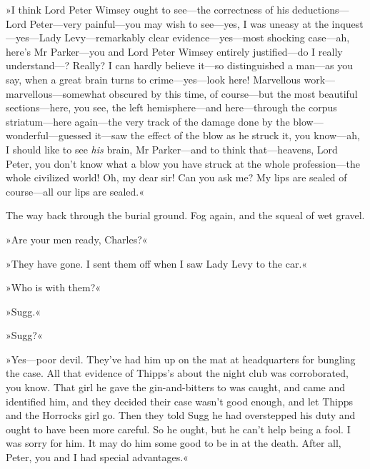 »I think Lord Peter Wimsey ought to see\allowbreak---\allowbreak the correctness of his deductions\allowbreak---\allowbreak Lord Peter\allowbreak---\allowbreak very painful\allowbreak---\allowbreak you may wish to see\allowbreak---\allowbreak yes, I was uneasy at the inquest\allowbreak---\allowbreak yes---Lady Levy\allowbreak---\allowbreak remarkably clear evidence\allowbreak---\allowbreak yes---most shocking case\allowbreak---\allowbreak ah, here's Mr Parker\allowbreak---\allowbreak you and Lord Peter Wimsey entirely justified\allowbreak---\allowbreak do I really under\-stand---? Really? I can hardly believe it\allowbreak---\allowbreak so distinguished a man\allowbreak---\allowbreak as you say, when a great brain turns to crime\allowbreak---\allowbreak yes---look here! Marvellous work\allowbreak---\allowbreak marvellous---somewhat obscured by this time, of course\allowbreak---\allowbreak but the most beautiful sections\allowbreak---\allowbreak here, you see, the left hemisphere\allowbreak---\allowbreak and here\allowbreak---\allowbreak through the corpus striatum\allowbreak---\allowbreak here again\allowbreak---\allowbreak the very track of the damage done by the blow\allowbreak---\allowbreak wonderful---guessed it\allowbreak---\allowbreak saw the effect of the blow as he struck it, you know\allowbreak---\allowbreak ah, I should like to see \textit{his} brain, Mr Parker\allowbreak---\allowbreak and to think that\allowbreak---\allowbreak heavens, Lord Peter, you don't know what a blow you have struck at the whole profession\allowbreak---\allowbreak the whole civilized world! Oh, my dear sir! Can you ask me? My lips are sealed of course\allowbreak---\allowbreak all our lips are sealed.«

The way back through the burial ground. Fog again, and the squeal of wet gravel.

»Are your men ready, Charles?«

»They have gone. I sent them off when I saw Lady Levy to the car.«

»Who is with them?«

»Sugg.«

»Sugg?«

»Yes\allowbreak---\allowbreak poor devil. They've had him up on the mat at headquarters for bungling the case. All that evidence of Thipps's about the night club was corroborated, you know. That girl he gave the gin-and-bitters to was caught, and came and identified him, and they decided their case wasn't good enough, and let Thipps and the Horrocks girl go. Then they told Sugg he had overstepped his duty and ought to have been more careful. So he ought, but he can't help being a fool. I was sorry for him. It may do him some good to be in at the death. After all, Peter, you and I had special advantages.«


